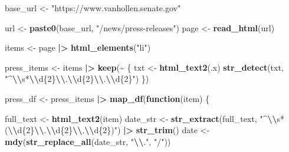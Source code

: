 \documentclass[
]{article}
\newenvironment{Shaded}{\begin{snugshade}}{\end{snugshade}}
\newcommand{\ControlFlowTok}[1]{\textcolor[rgb]{0.13,0.29,0.53}{\textbf{#1}}}
\newcommand{\FunctionTok}[1]{\textcolor[rgb]{0.13,0.29,0.53}{\textbf{#1}}}
\newcommand{\NormalTok}[1]{#1}
\newcommand{\OtherTok}[1]{\textcolor[rgb]{0.56,0.35,0.01}{#1}}
\newcommand{\SpecialCharTok}[1]{\textcolor[rgb]{0.81,0.36,0.00}{\textbf{#1}}}
\newcommand{\StringTok}[1]{\textcolor[rgb]{0.31,0.60,0.02}{#1}}
\begin{document}
\begin{Shaded}
\begin{Highlighting}[]
\NormalTok{base\_url }\OtherTok{\textless{}{-}} \StringTok{"https://www.vanhollen.senate.gov"}


\NormalTok{url }\OtherTok{\textless{}{-}} \FunctionTok{paste0}\NormalTok{(base\_url, }\StringTok{"/news/press{-}releases"}\NormalTok{)}
\NormalTok{page }\OtherTok{\textless{}{-}} \FunctionTok{read\_html}\NormalTok{(url)}


\NormalTok{items }\OtherTok{\textless{}{-}}\NormalTok{ page }\SpecialCharTok{|\textgreater{}} \FunctionTok{html\_elements}\NormalTok{(}\StringTok{"li"}\NormalTok{)}


\NormalTok{press\_items }\OtherTok{\textless{}{-}}\NormalTok{ items }\SpecialCharTok{|\textgreater{}} \FunctionTok{keep}\NormalTok{(}\SpecialCharTok{\textasciitilde{}}\NormalTok{ \{}
\NormalTok{  txt }\OtherTok{\textless{}{-}} \FunctionTok{html\_text2}\NormalTok{(.x)}
  \FunctionTok{str\_detect}\NormalTok{(txt, }\StringTok{"\^{}}\SpecialCharTok{\textbackslash{}\textbackslash{}}\StringTok{s*}\SpecialCharTok{\textbackslash{}\textbackslash{}}\StringTok{d\{2\}}\SpecialCharTok{\textbackslash{}\textbackslash{}}\StringTok{.}\SpecialCharTok{\textbackslash{}\textbackslash{}}\StringTok{d\{2\}}\SpecialCharTok{\textbackslash{}\textbackslash{}}\StringTok{.}\SpecialCharTok{\textbackslash{}\textbackslash{}}\StringTok{d\{2\}"}\NormalTok{)}
\NormalTok{\})}


\NormalTok{press\_df }\OtherTok{\textless{}{-}}\NormalTok{ press\_items }\SpecialCharTok{|\textgreater{}} \FunctionTok{map\_df}\NormalTok{(}\ControlFlowTok{function}\NormalTok{(item) \{}

\NormalTok{  full\_text }\OtherTok{\textless{}{-}} \FunctionTok{html\_text2}\NormalTok{(item)}
\NormalTok{  date\_str }\OtherTok{\textless{}{-}} \FunctionTok{str\_extract}\NormalTok{(full\_text, }\StringTok{"\^{}}\SpecialCharTok{\textbackslash{}\textbackslash{}}\StringTok{s*(}\SpecialCharTok{\textbackslash{}\textbackslash{}}\StringTok{d\{2\}}\SpecialCharTok{\textbackslash{}\textbackslash{}}\StringTok{.}\SpecialCharTok{\textbackslash{}\textbackslash{}}\StringTok{d\{2\}}\SpecialCharTok{\textbackslash{}\textbackslash{}}\StringTok{.}\SpecialCharTok{\textbackslash{}\textbackslash{}}\StringTok{d\{2\})"}\NormalTok{) }\SpecialCharTok{|\textgreater{}} \FunctionTok{str\_trim}\NormalTok{()}
\NormalTok{  date }\OtherTok{\textless{}{-}} \FunctionTok{mdy}\NormalTok{(}\FunctionTok{str\_replace\_all}\NormalTok{(date\_str, }\StringTok{"}\SpecialCharTok{\textbackslash{}\textbackslash{}}\StringTok{."}\NormalTok{, }\StringTok{"/"}\NormalTok{)) }



\end{Highlighting}
\end{Shaded}
\end{document}
